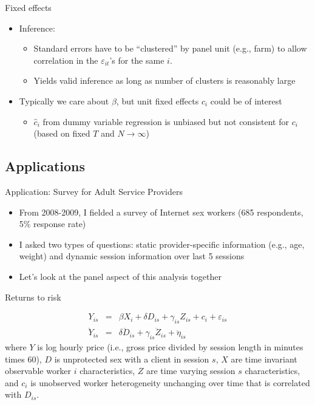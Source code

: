 \documentclass{beamer}
\begin{document}
\begin{frame}{Fixed effects}
	
	\begin{itemize}
	\item Inference:
		\begin{itemize}
		\item Standard errors have to be ``clustered'' by panel unit (e.g., farm) to allow correlation in the $\varepsilon_{it}$'s for the same $i$.
		\item Yields valid inference as long as number of clusters is reasonably large
		\end{itemize}	
	\item Typically we care about $\beta$, but unit fixed effects $c_i$ could be of interest
		\begin{itemize}
		\item $\widehat{c}_i$ from dummy variable regression is unbiased but not consistent for $c_i$ (based on fixed $T$ and $N\rightarrow \infty$)
		\end{itemize}
	\end{itemize}
\end{frame}

\subsection{Applications }


\begin{frame}{Application: Survey for Adult Service Providers}

\begin{itemize}
\item From 2008-2009, I fielded a survey of Internet sex workers (685 respondents, 5\% response rate)
\item I asked two types of questions: static provider-specific information (e.g., age, weight) and dynamic session information over last 5 sessions
\item Let's look at the panel aspect of this analysis together
\end{itemize}

\end{frame}

\begin{frame}{Returns to risk}

\begin{eqnarray*}
Y_{is} &=& \beta X_i + \delta{D_{is}} + \gamma_{is} Z_{is} + c_i + \varepsilon_{is} \\
\ddot{Y}_{is} &=&  \delta \ddot{D}_{is} +  \gamma_{is} \ddot{Z}_{is} + \ddot \eta_{is}
\end{eqnarray*}where $Y$ is log hourly price (i.e., gross price divided by session length in minutes times 60), $D$ is unprotected sex with a client in session $s$,  $X$ are time invariant observable worker $i$ characteristics, $Z$ are time varying session $s$ characteristics, and $c_i$ is unobserved worker heterogeneity unchanging over time that is correlated with $D_{is}$.

\end{frame}
\end{document}
